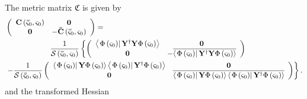 \documentclass[aps,preprint]{revtex4}%
\begin{document}
The metric matrix $\mathfrak{C}$ is given by
\begin{align}
&  \left(
\begin{array}
[c]{cc}%
\mathbf{C}\left(  \mathbf{\bar{\varsigma}}_{0},\mathbf{\varsigma}_{0}\right)
& \mathbf{0}\\
\mathbf{0} & -\mathbf{\bar{C}}\left(  \mathbf{\bar{\varsigma}}_{0}%
,\mathbf{\varsigma}_{0}\right)
\end{array}
\right)  =\nonumber\\
&  \qquad\qquad\qquad\frac{1}{\mathcal{S}\left(  \mathbf{\bar{\varsigma}}%
_{0},\mathbf{\varsigma}_{0}\right)  }\left\{  \left(
\begin{array}
[c]{cc}%
\left\langle \left.  \Phi\left(  \mathbf{\varsigma}_{0}\right)  \right\vert
\mathbf{Y}^{\dagger}\mathbf{Y}\Phi\left(  \mathbf{\varsigma}_{0}\right)
\right\rangle  & \mathbf{0}\\
\mathbf{0} & -\overline{\left\langle \left.  \Phi\left(  \mathbf{\varsigma
}_{0}\right)  \right\vert \mathbf{Y}^{\dagger}\mathbf{Y}\Phi\left(
\mathbf{\varsigma}_{0}\right)  \right\rangle }%
\end{array}
\right)  \right. \nonumber\\
&  \left.  -\frac{1}{\mathcal{S}\left(  \mathbf{\bar{\varsigma}}%
_{0},\mathbf{\varsigma}_{0}\right)  }\left(
\begin{array}
[c]{cc}%
\left\langle \left.  \Phi\left(  \mathbf{\varsigma}_{0}\right)  \right\vert
\mathbf{Y}\Phi\left(  \mathbf{\varsigma}_{0}\right)  \right\rangle
\left\langle \left.  \Phi\left(  \mathbf{\varsigma}_{0}\right)  \right\vert
\mathbf{Y}^{\dagger}\Phi\left(  \mathbf{\varsigma}_{0}\right)  \right\rangle
& \mathbf{0}\\
\mathbf{0} & \overline{\left\langle \left.  \Phi\left(  \mathbf{\varsigma}%
_{0}\right)  \right\vert \mathbf{Y}\Phi\left(  \mathbf{\varsigma}_{0}\right)
\right\rangle \left\langle \left.  \Phi\left(  \mathbf{\varsigma}_{0}\right)
\right\vert \mathbf{Y}^{\dagger}\Phi\left(  \mathbf{\varsigma}_{0}\right)
\right\rangle }%
\end{array}
\right)  \right\}  .
\end{align}
and the transformed Hessian%
\end{document}
